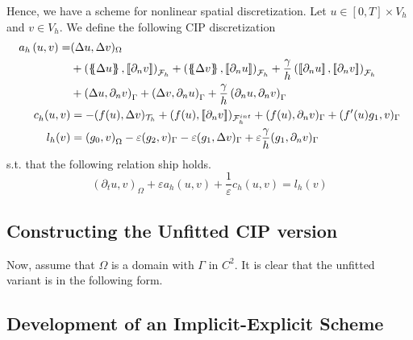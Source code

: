 Hence, we have a scheme for nonlinear spatial discretization. Let $u \in \left[ 0,T \right] \times V_{h}  $ and $v \in V_{h}$. We define the following CIP discretization
\begin{equation}
    \label{eq:cip_ch}
    \begin{split}
        a_{h} \left( u, v \right)   =& ( \Delta  u, \Delta v ) _{ \Omega } \\
                                     & + \left( \mean{  \Delta  u }, \jump{ \partial _{n }v} \right)_{\mathcal{F}_{h}  }  + \left( \mean{ \Delta  v }, \jump{ \partial _{n}u }      \right)_{\mathcal{F}_{h}  }  + \frac{\gamma }{h}  \left( \jump{ \partial _{n} u}, \jump{ \partial _{n} v   }   \right)_{\mathcal{F}_{h} } \\
                                     & + \left(   \Delta  u ,  \partial _{n }v \right)_{\Gamma   }  + \left(  \Delta  v ,  \partial _{n}u       \right)_{\Gamma  }  + \frac{\gamma }{h}  \left(  \partial _{n} u,  \partial _{n} v      \right)_{ \Gamma } \\
    c^{}_{h} ( u,v)  & = -( f( u), \Delta v )_{\mathcal{T} _{h}}+  ( f( u) , \jump{ \partial _{n}v }  )_{\mathcal{F} _{h}^{int}} + ( f(u), \partial _{n} v)_{\Gamma  }  + ( f'( u)  g_{1}   ,  v)_{\Gamma } \\
    l_{h}( v_{}) & =  \left( g_{0}, v \right) _{\Omega } -  \varepsilon ( g_{2},  v )_{\Gamma }  -  \varepsilon ( g_{1}, \Delta  v  )_{\Gamma }  + \varepsilon \frac{\gamma }{h} ( g_{1}, \partial _{n} v  )_{\Gamma }
    \end{split}
\end{equation}
s.t. that the following relation ship holds.
\[
    ( \partial _{t}u, v)_\Omega + \varepsilon  a_{h}( u,v) + \frac{1}{\varepsilon }c_{h}( u,v)   =  l_{h}(v)
\]

\subsection{Constructing the Unfitted CIP version}%
\label{sub:constructing_the_unfitted_cip_version}

Now, assume that $\Omega $ is a domain with $\Gamma $ in $C^2$. It is clear that the unfitted variant is in the following form.




\subsection{Development of an Implicit-Explicit Scheme}
\label{sub:implicit_explicit_scheme}

